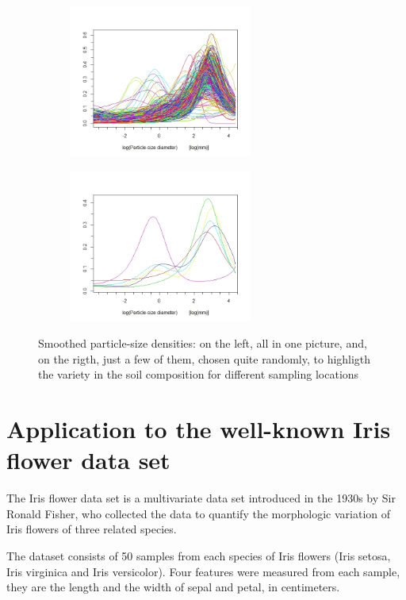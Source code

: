 \begin{figure}[ht]
	
	\begin{subfigure}{.5\textwidth}
		\includegraphics[width=6cm]{./pictures/psc/psc_all_res_4.jpeg} 
		\label{fig:subim1}
	\end{subfigure}
	\begin{subfigure}{.5\textwidth}
		\includegraphics[width=6cm]{./pictures/psc/psc_few_res_4.jpeg}
		\label{fig:subim2}
	\end{subfigure}
	
	\caption{Smoothed particle-size densities: on the left, all in one picture, and, on the rigth, just a few of them, chosen quite randomly, to highligth the variety in the soil composition for different sampling locations}
	\label{fig:psc_smoothed}
	
\end{figure}


\section{Application to the well-known Iris flower data set}
The Iris flower data set is a multivariate data set introduced in the 1930s by Sir Ronald Fisher, who collected the data to quantify the morphologic variation of Iris flowers of three related species.
 
The dataset consists of 50 samples from each species of Iris flowers (Iris setosa, Iris virginica and Iris versicolor). Four features were measured from each sample, they are the length and the width of sepal and petal, in centimeters. 

